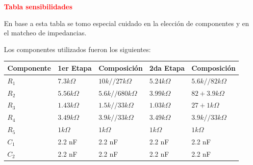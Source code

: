\begin{center}
	\huge{\textcolor{red}{\textbf{Tabla sensibilidades}}}
\end{center}
En base a esta tabla se tomo especial cuidado en la elección de componentes y en el matcheo de impedancias.

Los componentes utilizados fueron los siguientes:
\begin{table}[H]
\centering
\begin{tabular}{lllll}
\multicolumn{1}{c}{Componente} & \multicolumn{1}{c}{1er Etapa} & \multicolumn{1}{c}{Composición} & 2da Etapa      & Composición           \\ \hline
$R_1$                          & $7.3 k\Omega$                 & $10k // 27k  \Omega$            & $5.24 k\Omega$ & $5.6k // 82k  \Omega$ \\
$R_2$                          & $5.56 k\Omega$                & $5.6k // 680k  \Omega$          & $3.99 k\Omega$ & $82 + 3.9k  \Omega$   \\
$R_3$                          & $1.43 k\Omega$                & $1.5 k // 33k  \Omega$          & $1.03k\Omega$  & $27 + 1k  \Omega$     \\
$R_4$                          & $3.49 k\Omega$                & $3.9k // 33k  \Omega$           & $3.49 k\Omega$ & $3.9k // 33k  \Omega$ \\
$R_5$                          & $1 k\Omega$                   & $1 k  \Omega$                   & $1 k\Omega$    & $1 k\Omega$           \\
$C_1$                          & 2.2 nF                        & 2.2 nF                          & 2.2 nF         & 2.2 nF                \\
$C_2$                          & 2.2 nF                        & 2.2 nF                          & 2.2 nF         & 2.2 nF               
\end{tabular}
\end{table}

